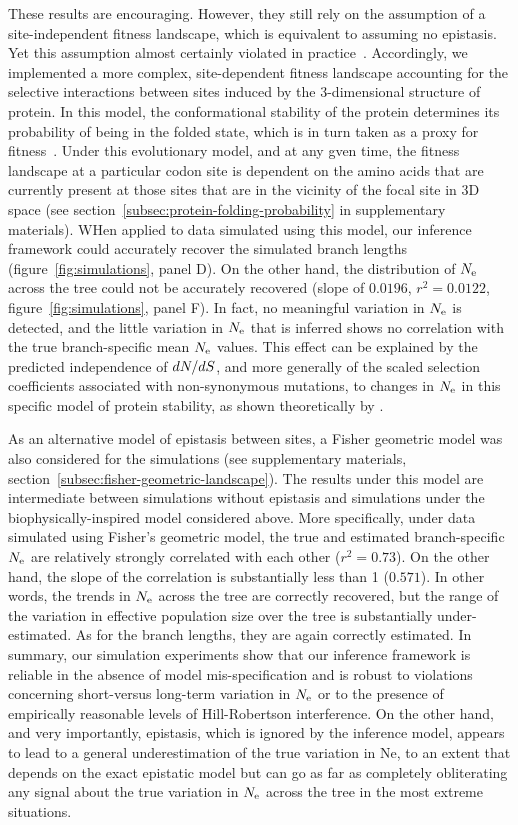 These results are encouraging.
However, they still rely on the assumption of a site-independent fitness landscape, which is equivalent to assuming no epistasis.
Yet this assumption almost certainly violated in practice~\citep{Pollock2014,Shah2015}.
Accordingly, we implemented a more complex, site-dependent fitness landscape accounting for the selective interactions between sites induced by the 3-dimensional structure of protein.
In this model, the conformational stability of the protein determines its probability of being in the folded state, which is in turn taken as a proxy for fitness~\citep{Williams2006, Goldstein2011, Pollock2012}.
Under this evolutionary model, and at any gven time, the fitness landscape at a particular codon site is dependent on the amino acids that are currently present at those sites that are in the vicinity of the focal site in 3D space (see section~\ref{subsec:protein-folding-probability} in supplementary materials).
WHen applied to data simulated using this model, our inference framework could accurately recover the simulated branch lengths (figure~\ref{fig:simulations}, panel D).
On the other hand, the distribution of $N_{\text{e}}$ across the tree could not be accurately recovered (slope of $0.0196$, $r^2 = 0.0122$, figure~\ref{fig:simulations}, panel F).
In fact, no meaningful variation in $N_{\text{e}}$ is detected, and the little variation in $N_{\text{e}}$ that is inferred shows no correlation with the true branch-specific mean $N_{\text{e}}$ values.
This effect can be explained by the predicted independence of $dN/dS$, and more generally of the scaled selection coefficients associated with non-synonymous mutations, to changes in $N_{\text{e}}$ in this specific model of protein stability, as shown theoretically by \citet{Goldstein2013}.

As an alternative model of epistasis between sites, a Fisher geometric model was also considered for the simulations (see supplementary materials, section~\ref{subsec:fisher-geometric-landscape}).
The results under this model are intermediate between simulations without epistasis and simulations under the biophysically-inspired model considered above.
More specifically, under data simulated using Fisher’s geometric model, the true and estimated branch-specific $N_{\text{e}}$ are relatively strongly correlated with each other ($r^2 = 0.73$).
On the other hand, the slope of the correlation is substantially less than 1 ($0.571$).
In other words, the trends in $N_{\text{e}}$ across the tree are correctly recovered, but the range of the variation in effective population size over the tree is substantially under-estimated.
As for the branch lengths, they are again correctly estimated.
In summary, our simulation experiments show that our inference framework is reliable in the absence of model mis-specification and is robust to violations concerning short-versus long-term variation in $N_{\text{e}}$ or to the presence of empirically reasonable levels of Hill-Robertson interference.
On the other hand, and very importantly, epistasis, which is ignored by the inference model, appears to lead to a general underestimation of the true variation in Ne, to an extent that depends on the exact epistatic model but can go as far as completely obliterating any signal about the true variation in $N_{\text{e}}$ across the tree in the most extreme situations.

